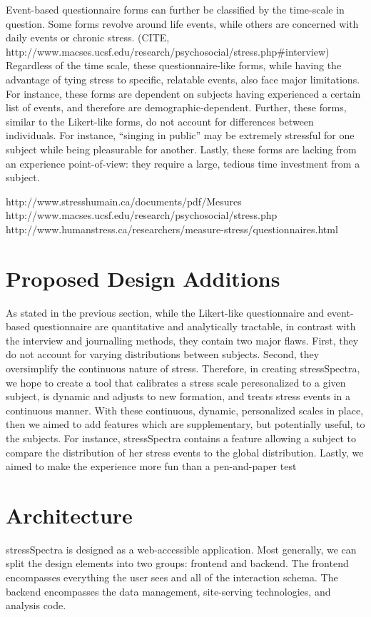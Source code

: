 \documentclass{sigchi}
\begin{document}
Event-based questionnaire forms can further be classified by the time-scale in question. Some forms revolve around life events, while others are concerned with daily events or chronic stress. (CITE, http://www.macses.ucsf.edu/research/psychosocial/stress.php\#interview) Regardless of the time scale, these questionnaire-like forms, while having the advantage of tying stress to specific, relatable events, also face major limitations. For instance, these forms are dependent on subjects having experienced a certain list of events, and therefore are demographic-dependent. Further, these forms, similar to the Likert-like forms, do not account for differences between individuals. For instance, “singing in public” may be extremely stressful for one subject while being pleasurable for another. Lastly, these forms are lacking from an experience point-of-view: they require a large, tedious time investment from a subject.

http://www.stresshumain.ca/documents/pdf/Mesures%
http://www.macses.ucsf.edu/research/psychosocial/stress.php
http://www.humanstress.ca/researchers/measure-stress/questionnaires.html


\section{Proposed Design Additions}
As stated in the previous section, while the Likert-like questionnaire and event-based questionnaire are quantitative and analytically tractable, in contrast with the interview and journalling methods, they contain two major flaws. First, they do not account for varying distributions between subjects. Second, they oversimplify the continuous nature of stress.
Therefore, in creating stressSpectra, we hope to create a tool that calibrates a stress scale peresonalized to a given subject, is dynamic and adjusts to new formation, and treats stress events in a continuous manner.
With these continuous, dynamic, personalized scales in place, then we aimed to add features which are supplementary, but potentially useful, to the subjects. For instance, stressSpectra contains a feature allowing a subject to compare the distribution of her stress events to the global distribution. Lastly, we aimed to make the experience more fun than a pen-and-paper test

\section{Architecture}
stressSpectra is designed as a web-accessible application. Most generally, we can split the design elements into two groups: frontend and backend. The frontend encompasses everything the user sees and all of the interaction schema. The backend encompasses the data management, site-serving technologies, and analysis code. 
\end{document}
